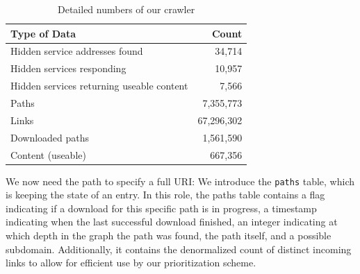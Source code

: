 \iflncs
  \begin{table}
    \vspace{-23pt}
    \begin{tabular}{l|r}
    \hline
    \textbf{Type of Data}           & \textbf{Count} \\
    \hline
    \hline
    Hidden service addresses found      & 34,714                                    \\
    \hline
    Hidden services responding                & 10,957                      \\
    \hline
    Hidden services returning useable content & 7,566                      \\
    \hline
    Paths                           & 7,355,773                   \\
    \hline
    Links                           & 67,296,302                \\
    \hline
    Downloaded paths                & 1,561,590                 \\
    \hline
    Content (useable)               & 667,356         \\
    \hline
    \end{tabular}
    \caption{Detailed numbers of our crawler}
    \label{table:scrapMetrics}
  \end{table}
\fi

We now need the path to specify a full URI: We introduce the \texttt{paths} table, which is keeping the state of an entry. In this role, the paths table contains a flag indicating if a download for this specific path is in progress, a timestamp indicating when the last successful download finished, an integer indicating at which depth in the graph the path was found, the path itself, and a possible subdomain. Additionally, it contains the denormalized count of distinct incoming links to allow for efficient use by our prioritization scheme.


